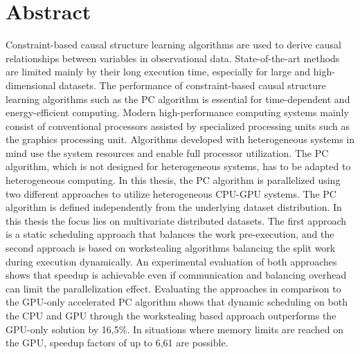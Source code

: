 \chapter*{Abstract}
Constraint-based causal structure learning algorithms are used to derive causal relationships between variables in observational data. State-of-the-art methods are limited mainly by their long execution time, especially for large and high-dimensional datasets. The performance of constraint-based causal structure learning algorithms such as the PC algorithm is essential for time-dependent and energy-efficient computing. Modern high-performance computing systems mainly consist of conventional processors assisted by specialized processing units such as the graphics processing unit. Algorithms developed with heterogeneous systems in mind use the system resources and enable full processor utilization. The PC algorithm, which is not designed for heterogeneous systems, has to be adapted to heterogeneous computing. In this thesis, the PC algorithm is parallelized using two different approaches to utilize heterogeneous CPU-GPU systems. The PC algorithm is defined independently from the underlying dataset distribution. In this thesis the focus lies on multivariate distributed datasets. The first approach is a static scheduling approach that balances the work pre-execution, and the second approach is based on workstealing algorithms balancing the split work during execution dynamically. An experimental evaluation of both approaches shows that speedup is achievable even if communication and balancing overhead can limit the parallelization effect. Evaluating the approaches in comparison to the GPU-only accelerated PC algorithm shows that dynamic scheduling on both the CPU and GPU through the workstealing based approach outperforms the GPU-only solution by 16,5\%. In situations where memory limits are reached on the GPU, speedup factors of up to 6,61 are possible.

